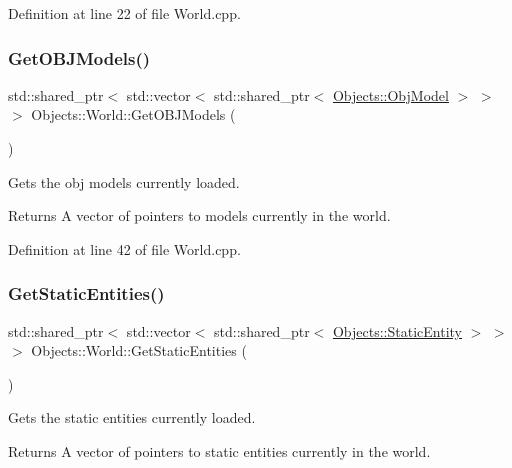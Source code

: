 Definition at line 22 of file World.\+cpp.

\mbox{\label{class_objects_1_1_world_a09762556086e4534f26af0e6092d794a}} 
\subsubsection{\texorpdfstring{Get\+O\+B\+J\+Models()}{GetOBJModels()}}
{\footnotesize\ttfamily std\+::shared\+\_\+ptr$<$ std\+::vector$<$ std\+::shared\+\_\+ptr$<$ \hyperlink{class_objects_1_1_obj_model}{Objects\+::\+Obj\+Model} $>$ $>$ $>$ Objects\+::\+World\+::\+Get\+O\+B\+J\+Models (\begin{DoxyParamCaption}{ }\end{DoxyParamCaption})}

Gets the obj models currently loaded. \begin{DoxyReturn}{Returns}
A vector of pointers to models currently in the world. 
\end{DoxyReturn}


Definition at line 42 of file World.\+cpp.

\mbox{\label{class_objects_1_1_world_a8f430397fa8f3c30d2105f8d7e5268e3}} 
\subsubsection{\texorpdfstring{Get\+Static\+Entities()}{GetStaticEntities()}}
{\footnotesize\ttfamily std\+::shared\+\_\+ptr$<$ std\+::vector$<$ std\+::shared\+\_\+ptr$<$ \hyperlink{class_objects_1_1_static_entity}{Objects\+::\+Static\+Entity} $>$ $>$ $>$ Objects\+::\+World\+::\+Get\+Static\+Entities (\begin{DoxyParamCaption}{ }\end{DoxyParamCaption})}

Gets the static entities currently loaded. \begin{DoxyReturn}{Returns}
A vector of pointers to static entities currently in the world. 
\end{DoxyReturn}


